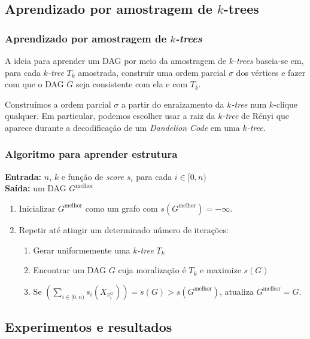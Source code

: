 \documentclass{beamer}
\begin{document}
  \subsection{Aprendizado por amostragem de $k$-trees}

  \begin{frame}
    \frametitle{Aprendizado por amostragem de \emph{$k$-trees}}

    A ideia para aprender um DAG por meio da amostragem de \emph{$k$-trees} baseia-se em, para cada \emph{$k$-tree} $T_k$ amostrada, construir uma ordem parcial $\sigma$ dos vértices e fazer com que o DAG $G$ seja consistente com ela e com $T_k$.

    \vspace{1em}

    Construímos a ordem parcial $\sigma$ a partir do enraizamento da \emph{$k$-tree} num $k$-clique qualquer. Em particular, podemos escolher usar a raiz da \emph{$k$-tree} de Rényi que aparece durante a decodificação de um \emph{Dandelion Code} em uma \emph{$k$-tree}.
  \end{frame}

  \begin{frame}
    \frametitle{Algoritmo para aprender estrutura}

    {
      \textbf{Entrada:} $n$, $k$ e função de \emph{score} $s_i$ para cada $i \in [0, n)$\\
      \textbf{Saída:} um DAG $G^{\text{melhor}}$

      \begin{enumerate}
        \item Inicializar $G^{\text{melhor}}$ como um grafo com $s(G^{\text{melhor}}) = -\infty$.
        \item Repetir até atingir um determinado número de iterações:
          \begin{enumerate}
            \item Gerar uniformemente uma \emph{$k$-tree} $T_k$
            \item Encontrar um DAG $G$ cuja moralização é $T_k$ e maximize $s(G)$
            \item Se $\left(\sum_{i \in [0,n)} s_i(X_{\pi^G_{i}})\right) = s(G) > s(G^{\text{melhor}})$, atualiza $G^{\text{melhor}} = G$.
          \end{enumerate}
      \end{enumerate}
    }
  \end{frame}

  \subsection{Experimentos e resultados}
\end{document}
